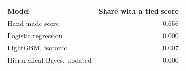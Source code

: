 \begin{tabular}{lr}
\toprule
Model & Share with a tied score \\
\midrule
Hand-made score & 0.656 \\
Logistic regression & 0.000 \\
LightGBM, isotonic & 0.007 \\
Hierarchical Bayes, updated & 0.000 \\
\bottomrule
\end{tabular}
